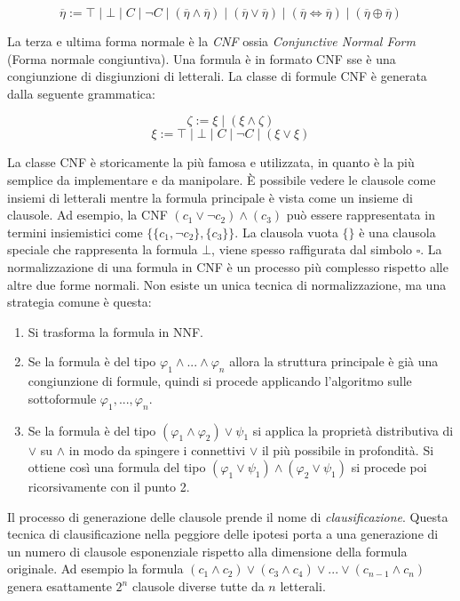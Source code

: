 \documentclass[./main.tex]{subfiles}
\begin{document}
$$ \overline{\eta}  := \top \mid \bot \mid C \mid \lnot C \mid (\overline{\eta} \land \overline{\eta}) \mid (\overline{\eta} \lor \overline{\eta} ) \mid (\overline{\eta} \Leftrightarrow \overline{\eta}) \mid (\overline{\eta} \oplus \overline{\eta}) $$

La terza e ultima forma normale è la \textit{CNF} ossia \textit{Conjunctive Normal Form} (Forma normale congiuntiva). Una formula è in formato CNF
sse è una congiunzione di disgiunzioni di letterali. La classe di formule CNF è generata dalla seguente grammatica:


$$ \zeta := \xi \mid (\xi \land \zeta) $$
$$ \xi := \top \mid \bot \mid C \mid \lnot C \mid (\xi \lor \xi ) $$

La classe CNF è storicamente la più famosa e utilizzata, in quanto è la più semplice da implementare e da manipolare. È possibile vedere le clausole
come insiemi di letterali mentre la formula principale è vista come un insieme di clausole. Ad esempio, la CNF $(c_1 \lor \lnot c_2) \land (c_3)$ può essere rappresentata
in termini insiemistici come $\{\{c_1, \lnot c_2\}, \{c_3\}\}$. 
La clausola vuota $\{\}$ è una clausola speciale che rappresenta la formula $\bot$, viene spesso raffigurata dal simbolo $\square$.
La normalizzazione di una formula in CNF è un processo più complesso rispetto alle altre due forme normali. Non esiste un unica tecnica di normalizzazione, ma
una strategia comune è questa:
\begin{enumerate}
  \item Si trasforma la formula in NNF.
  \item Se la formula è del tipo $\varphi_1 \land ... \land \varphi_n$ allora la struttura principale è già una congiunzione di formule,
   quindi si procede applicando l'algoritmo sulle sottoformule $\varphi_1, ..., \varphi_n$.
  \item Se la formula è del tipo $(\varphi_1 \land \varphi_2) \lor \psi_1$ si applica la proprietà distributiva di $\lor$ su $\land$ in 
  modo da spingere i connettivi $\lor$ il più possibile in profondità. Si ottiene così una formula del tipo
  $(\varphi_1 \lor \psi_1) \land (\varphi_2 \lor \psi_1)$ si procede poi ricorsivamente con il punto 2.
\end{enumerate}

Il processo di generazione delle clausole prende il nome di \textit{clausificazione}.
Questa tecnica di clausificazione nella peggiore delle ipotesi porta a una generazione di un numero di clausole esponenziale 
rispetto alla dimensione della formula originale. Ad esempio la formula $(c_1 \land c_2) \lor (c_3 \land c_4) \lor ... \lor (c_{n-1} \land c_{n})$ 
genera esattamente $2^{n}$ clausole diverse tutte da $n$ letterali.
\end{document}
